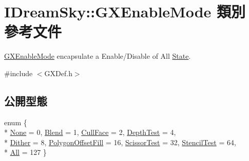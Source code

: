 \hypertarget{class_i_dream_sky_1_1_g_x_enable_mode}{}\section{I\+Dream\+Sky\+:\+:G\+X\+Enable\+Mode 類別 參考文件}
\label{class_i_dream_sky_1_1_g_x_enable_mode}


\hyperlink{class_i_dream_sky_1_1_g_x_enable_mode}{G\+X\+Enable\+Mode} encapsulate a Enable/\+Disable of All \hyperlink{class_i_dream_sky_1_1_state}{State}.  




{\ttfamily \#include $<$G\+X\+Def.\+h$>$}

\subsection*{公開型態}
\begin{DoxyCompactItemize}
\item 
enum \{ \\*
\hyperlink{class_i_dream_sky_1_1_g_x_enable_mode_a71ccd6deecee0cb55fd02e61a50151eeace0f17bc1712202170accf1df7909640}{None} = 0, 
\hyperlink{class_i_dream_sky_1_1_g_x_enable_mode_a71ccd6deecee0cb55fd02e61a50151eeaa495b444bc44e895c94d9b7853f5413c}{Blend} = 1, 
\hyperlink{class_i_dream_sky_1_1_g_x_enable_mode_a71ccd6deecee0cb55fd02e61a50151eeaa52d7b60dd84783f25bb30747641a0c6}{Cull\+Face} = 2, 
\hyperlink{class_i_dream_sky_1_1_g_x_enable_mode_a71ccd6deecee0cb55fd02e61a50151eeada951b5bbb8aac709e642be54ac7fd5e}{Depth\+Test} = 4, 
\\*
\hyperlink{class_i_dream_sky_1_1_g_x_enable_mode_a71ccd6deecee0cb55fd02e61a50151eeaec536b42f141b29d770153bf50821f54}{Dither} = 8, 
\hyperlink{class_i_dream_sky_1_1_g_x_enable_mode_a71ccd6deecee0cb55fd02e61a50151eea8fe94b012480f068321f73f2f9b5fceb}{Polygon\+Offset\+Fill} = 16, 
\hyperlink{class_i_dream_sky_1_1_g_x_enable_mode_a71ccd6deecee0cb55fd02e61a50151eeacd4fa106fd1da6db3d45975cbae2474b}{Scissor\+Test} = 32, 
\hyperlink{class_i_dream_sky_1_1_g_x_enable_mode_a71ccd6deecee0cb55fd02e61a50151eeafc42d10a4e8312c05b5d0b10bba5341b}{Stencil\+Test} = 64, 
\\*
\hyperlink{class_i_dream_sky_1_1_g_x_enable_mode_a71ccd6deecee0cb55fd02e61a50151eeaa7e2bd8764a203fc7dd8dfcf7cf9bc17}{All} = 127
 \}
\end{DoxyCompactItemize}

